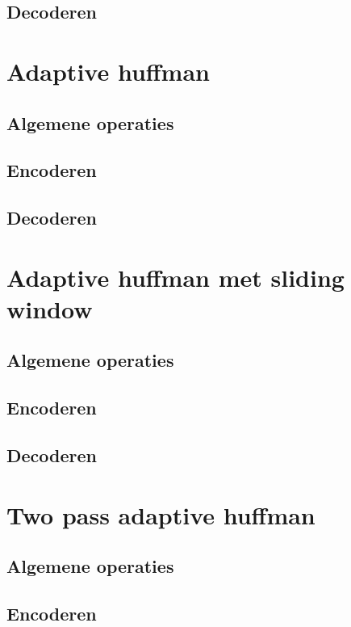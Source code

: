 \documentclass[a4paper,12pt]{report}
\begin{document}
\subsection{Decoderen}

\section{Adaptive huffman}
\subsection{Algemene operaties}

\subsection{Encoderen}

\subsection{Decoderen}

\section{Adaptive huffman met sliding window}
\subsection{Algemene operaties}

\subsection{Encoderen}

\subsection{Decoderen}


\section{Two pass adaptive huffman}
\subsection{Algemene operaties}

\subsection{Encoderen}
\end{document}
